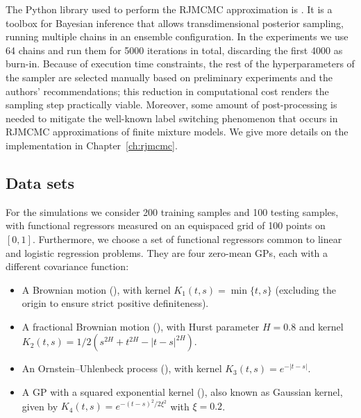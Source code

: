 The Python library used to perform the \acs{RJMCMC} approximation is  \citep{karnesis2023eryn}. It is a toolbox for Bayesian inference that allows transdimensional posterior sampling, running multiple chains in an ensemble configuration. In the experiments we use 64 chains and run them for 5000 iterations in total, discarding the first 4000 as burn-in. Because of execution time constraints, the rest of the hyperparameters of the  sampler are selected manually based on preliminary experiments and the authors' recommendations; this reduction in computational cost renders the sampling step practically viable. Moreover, some amount of post-processing is needed to mitigate the well-known label switching phenomenon that occurs in \acs{RJMCMC} approximations of finite mixture models. We give more details on the implementation in Chapter~\ref{ch:rjmcmc}.

\subsection{Data sets}

For the simulations we consider 200 training samples and 100 testing samples, with functional regressors measured on an equispaced grid of 100 points on \([0, 1]\). Furthermore, we choose a set of functional regressors common to linear and logistic regression problems. They are four zero-mean \acf{GPs}, each with a different covariance function:
\begin{itemize}
  \item A Brownian motion (), with kernel \(K_1(t,s)=\min\{t,s\}\) (excluding the origin to ensure strict positive definiteness).
  \item A fractional Brownian motion (), with Hurst parameter \(H=0.8\) and kernel \(K_2(t,s)=1/2(s^{2H} + t^{2H} - |t-s|^{2H})\).
  \item An Ornstein--Uhlenbeck process (), with kernel \(K_3(t,s)=e^{-|t-s|}\).
  \item A \acs{GP} with a squared exponential kernel (), also known as Gaussian kernel, given by \(K_4(t,s)=e^{-(t-s)^2/2\xi^2}\) with \(\xi=0.2\). 
\end{itemize}

